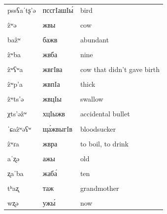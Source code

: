 \documentclass[
]{article}
\begin{document}
\begin{longtable}{l|l|l}
\hline
\cellcolor{gray!6}{nq’ʷɡaˈtʂ’ə} & \cellcolor{gray!6}{нкъвгашIы́} & \cellcolor{gray!6}{sick person}\\
\hline
pssʕaˈtʂ’ə & пссгIашIы́ & bird\\
\hline
\cellcolor{gray!6}{χaˈtʂ’ə} & \cellcolor{gray!6}{хашIы́} & \cellcolor{gray!6}{task}\\
\hline
ẑʷə & жвы & cow\\
\hline
\cellcolor{gray!6}{aˈẑʷa} & \cellcolor{gray!6}{ажва́} & \cellcolor{gray!6}{word}\\
\hline
baẑʷ & бажв & abundant\\
\hline
\cellcolor{gray!6}{ˈɡʷəẑʷk’ɾa} & \cellcolor{gray!6}{гвыж́вкIра} & \cellcolor{gray!6}{to be angry}\\
\hline
ẑʷba & жвба & nine\\
\hline
\cellcolor{gray!6}{ẑʷʕʷaˈqʰa} & \cellcolor{gray!6}{жвгIвахъа́} & \cellcolor{gray!6}{shoulder}\\
\hline
ẑʷʕʷa & жвгIва & cow that didn’t gave birth\\
\hline
\cellcolor{gray!6}{ẑʷʕʷand} & \cellcolor{gray!6}{жвгIванд} & \cellcolor{gray!6}{sky}\\
\hline
ẑʷp’a & жвпIа & thick\\
\hline
\cellcolor{gray!6}{ẑʷɾa} & \cellcolor{gray!6}{жвра} & \cellcolor{gray!6}{drink}\\
\hline
ẑʷts’ə & жвцIы & swallow\\
\hline
\cellcolor{gray!6}{ts’əẑʷ} & \cellcolor{gray!6}{цIыжв} & \cellcolor{gray!6}{tick}\\
\hline
χts’əẑʷ & хцIыжв & accidental bullet\\
\hline
\cellcolor{gray!6}{ˈtŝʷaẑʷaɾa} & \cellcolor{gray!6}{чва́жвара} & \cellcolor{gray!6}{to speak}\\
\hline
ˈɕaẑʷəʕʷ & ща́жвыгIв & bloodsucker\\
\hline
\cellcolor{gray!6}{pʰəẑʷˈbana} & \cellcolor{gray!6}{пыжвба́на} & \cellcolor{gray!6}{hedgehog}\\
\hline
ẑʷɾa & жвра & to boil, to drink\\
\hline
\cellcolor{gray!6}{ẑʷtŝʷa} & \cellcolor{gray!6}{жвчва} & \cellcolor{gray!6}{overdone (about food)}\\
\hline
aˈʐə & ажы & old\\
\hline
\cellcolor{gray!6}{ˈʕatʂ’ʐaɾa} & \cellcolor{gray!6}{гIа́шIжара} & \cellcolor{gray!6}{to tear off}\\
\hline
ʐaˈba & жаба́ & ten\\
\hline
\cellcolor{gray!6}{ˈʐʐaɡa} & \cellcolor{gray!6}{жжа́га} & \cellcolor{gray!6}{harrow}\\
\hline
tʰaʐ & таж & grandmother\\
\hline
\cellcolor{gray!6}{wasaˈɾaʐ} & \cellcolor{gray!6}{уасара́ж} & \cellcolor{gray!6}{wise}\\
\hline
wʐə & ужы́ & now\\
\hline
\end{longtable}
\end{document}
